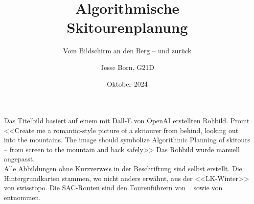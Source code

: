 \documentclass[a4paper, listof=numbered, numbers=noenddot]{scrarticle}
\title{\AKAfont\Huge\textcolor{AKSAcolor}{Algorithmische\\Skitourenplanung}}
\subtitle{Vom Bildschirm an den Berg -- und zurück}
\author{Jesse Born, G21D}
\date{Oktober 2024}
\begin{document}

\maketitle
\tableofcontents

% 






\clearpage


\printbibliography[heading=bibnumbered]
\clearpage

\appendix
{}
\glsaddallunused
\printglossary[type=\acronymtype, style=long, title={Abkürzungsverzeichnis}, nonumberlist]
\clearpage
\listoffigures


Das Titelbild basiert auf einem mit Dall-E von OpenAI erstellten Rohbild. Promt <<Create me a romantic-style picture of a skitourer from behind, looking out into the mountains. The image should symbolize Algorithmic Planning of skitours -- from screen to the mountain and back safely>> Das Rohbild wurde manuell angepasst.\\

Alle Abbildungen ohne Kurzverweis in der Beschriftung sind selbst erstellt. Die Hintergrundkarten stammen, wo nicht anders erwähnt, aus der <<LK-Winter>> von swisstopo. Die SAC-Routen sind den Tourenführern  von \citeauthor{mmzentralch}~\cite{mmzentralch} sowie  von \citeauthor{twslstgallappzll}~\cite{twslstgallappzll} entnommen.
\clearpage

\end{document}

